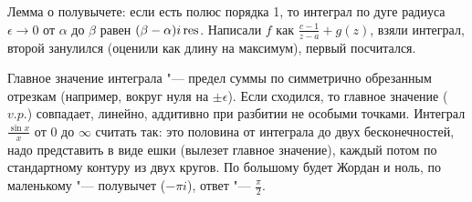 \section{} %
	Лемма о полувычете: если есть полюс порядка 1, то интеграл по дуге радиуса $\epsilon\to 0$ от $\alpha$ до $\beta$ равен $(\beta-\alpha)i \operatorname*{res}$.
	Написали $f$ как $\frac{c-1}{z-a}+g(z)$, взяли интеграл, второй занулился (оценили как длину на максимум), первый посчитался.

	Главное значение интеграла "--- предел суммы по симметрично обрезанным отрезкам (например, вокруг нуля на $\pm\epsilon$).
	Если сходился, то главное значение ($v.p.$) совпадает, линейно, аддитивно при разбитии не особыми точками.
	Интеграл $\frac{\sin x}{x}$ от 0 до $\infty$ считать так: это половина от интеграла до двух бесконечностей,
	надо представить в виде ешки (вылезет главное значение), каждый потом по стандартному контуру из двух кругов.
	По большому будет Жордан и ноль, по маленькому "--- полувычет ($-\pi i$), ответ "--- $\frac{\pi}{2}$.
